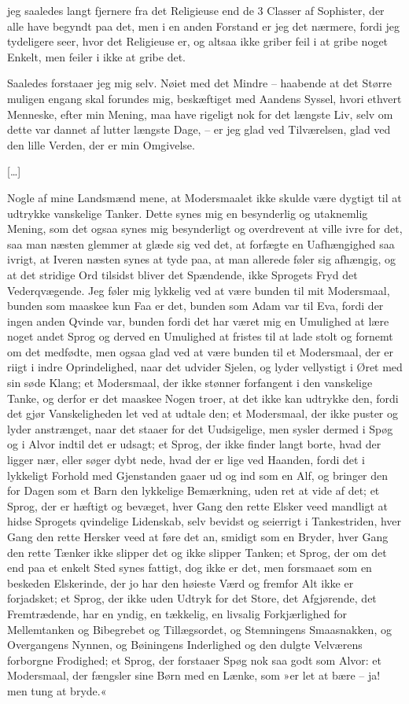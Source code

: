 \documentclass[12pt,a4paper]{article}
\begin{document}
jeg saaledes langt fjernere fra det Religieuse end de 3 Classer af Sophister, der alle have begyndt paa det, men i en anden Forstand er jeg det nærmere, fordi jeg tydeligere seer, hvor det Religieuse er, og altsaa ikke griber feil i at gribe noget Enkelt, men feiler i ikke at gribe det.

Saaledes forstaaer jeg mig selv. Nøiet med det Mindre – haabende at det Større muligen engang skal forundes mig, beskæftiget med Aandens Syssel, hvori ethvert Menneske, efter min Mening, maa have rigeligt nok for det længste Liv, selv om dette var dannet af lutter længste Dage, – er jeg glad ved Tilværelsen, glad ved den lille Verden, der er min Omgivelse.

[…]

Nogle af mine Landsmænd mene, at Modersmaalet ikke skulde være dygtigt til at udtrykke vanskelige Tanker. Dette synes mig en besynderlig og utaknemlig Mening, som det ogsaa synes mig besynderligt og overdrevent at ville ivre for det, saa man næsten glemmer at glæde sig ved det, at forfægte en Uafhængighed saa ivrigt, at Iveren næsten synes at tyde paa, at man allerede føler sig afhængig, og at det stridige Ord tilsidst bliver det Spændende, ikke Sprogets Fryd det Vederqvægende. Jeg føler mig lykkelig ved at være bunden til mit Modersmaal, bunden som maaskee kun Faa er det, bunden som Adam var til Eva, fordi der ingen anden Qvinde var, bunden fordi det har været mig en Umulighed at lære noget andet Sprog og derved en Umulighed at fristes til at lade stolt og fornemt om det medfødte, men ogsaa glad ved at være bunden til et Modersmaal, der er riigt i indre Oprindelighed, naar det udvider Sjelen, og lyder vellystigt i Øret med sin søde Klang; et Modersmaal, der ikke stønner forfangent i den vanskelige Tanke, og derfor er det maaskee Nogen troer, at det ikke kan udtrykke den, fordi det gjør Vanskeligheden let ved at udtale den; et Modersmaal, der ikke puster og lyder anstrænget, naar det staaer for det Uudsigelige, men sysler dermed i Spøg og i Alvor indtil det er udsagt; et Sprog, der ikke finder langt borte, hvad der ligger nær, eller søger dybt nede, hvad der er lige ved Haanden, fordi det i lykkeligt Forhold med Gjenstanden gaaer ud og ind som en Alf, og bringer den for Dagen som et Barn den lykkelige Bemærkning, uden ret at vide af det; et Sprog, der er hæftigt og bevæget, hver Gang den rette Elsker veed mandligt at hidse Sprogets qvindelige Lidenskab, selv bevidst og seierrigt i Tankestriden, hver Gang den rette Hersker veed at føre det an, smidigt som en Bryder, hver Gang den rette Tænker ikke slipper det og ikke slipper Tanken; et Sprog, der om det end paa et enkelt Sted synes fattigt, dog ikke er det, men forsmaaet som en beskeden Elskerinde, der jo har den høieste Værd og fremfor Alt ikke er forjadsket; et Sprog, der ikke uden Udtryk for det Store, det Afgjørende, det Fremtrædende, har en yndig, en tækkelig, en livsalig Forkjærlighed for Mellemtanken og Bibegrebet og Tillægsordet, og Stemningens Smaasnakken, og Overgangens Nynnen, og Bøiningens Inderlighed og den dulgte Velværens forborgne Frodighed; et Sprog, der forstaaer Spøg nok saa godt som Alvor: et Modersmaal, der fængsler sine Børn med en Lænke, som »er let at bære – ja! men tung at bryde.«
\end{document}
